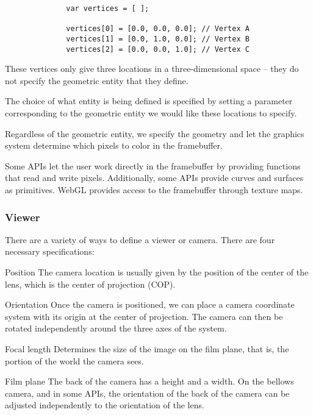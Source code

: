 \documentclass[\main/notes.tex]{subfiles}
\begin{document}
          \begin{example}
            \begin{verbatim}
              var vertices = [ ];

              vertices[0] = [0.0, 0.0, 0.0]; // Vertex A
              vertices[1] = [0.0, 1.0, 0.0]; // Vertex B
              vertices[2] = [0.0, 0.0, 1.0]; // Vertex C
            \end{verbatim}

            These vertices only give three locations in a three-dimensional space
            -- they do not specify the geometric entity that they define.

            The choice of what entity is being defined is specified by
            setting a parameter corresponding to the geometric entity we would like these locations
            to specify.

            Regardless of the geometric entity, we specify the geometry
            and let the graphics system determine which pixels to color in the framebuffer.
          \end{example}

          Some APIs let the user work directly in the framebuffer by
          providing functions that read and write pixels.
          Additionally, some APIs provide curves and surfaces as primitives.
          WebGL provides access to the framebuffer through texture maps.

        \pagebreak

        \subsubsection{Viewer}
          There are a variety of ways to define a viewer or camera.
          There are four necessary specifications:
          \begin{indentparagraph}
            \begin{descriptenum}[nosep]
              \item[Position] The camera location is usually given by the position of 
                the center of the lens, which is the center of projection (COP).
              \item[Orientation] Once the camera is positioned,
                we can place a camera coordinate system
                with its origin at the center of projection.
                The camera can then be rotated independently around the three axes of the system.
              \item[Focal length] Determines the size of the image on the film plane,
                that is, the portion of the world the camera sees.
              \item[Film plane] The back of the camera has a height and a width.
                On the bellows camera, and in some APIs, the orientation of the back of the camera
                can be adjusted independently to the orientation of the lens.
            \end{descriptenum}
          \end{indentparagraph}
\end{document}
